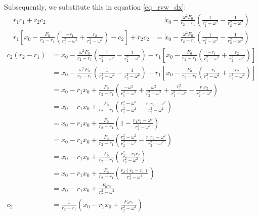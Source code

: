 Subsequently, we substitute this in equation \ref{eq_rvw_dx}:
\begin{align*}
	r_1 c_1 + r_2 c_2  &= \dot{x}_0 - \frac{\omega^2 F_0 }{r_2 - r_1} \left( \frac{1}{r_1^2 - \omega^2}  -  \frac{1}{r_2^2 - \omega^2} \right) \\
	r_1 \left[  x_0 - \frac{F_0}{r_2 - r_1} \left(  \frac{-r_1}{r_1^2 - \omega^2} +  \frac{r_2}{r_2^2 - \omega^2}   \right) - c_2  \right] + r_2 c_2 &= \dot{x}_0 - \frac{\omega^2 F_0 }{r_2 - r_1} \left( \frac{1}{r_1^2 - \omega^2}  -  \frac{1}{r_2^2 - \omega^2} \right) 
\end{align*}
\begin{align*}
	c_2 (r_2 - r_1) & = \dot{x}_0 - \frac{\omega^2 F_0 }{r_2 - r_1} \left( \frac{1}{r_1^2 - \omega^2}  -  \frac{1}{r_2^2 - \omega^2} \right) - r_1 \left[  x_0 -  \frac{F_0}{r_2 - r_1} \left(  \frac{-r_1}{r_1^2 - \omega^2} +  \frac{r_2}{r_2^2 - \omega^2}  \right) \right] \\
	&= \dot{x}_0 - \frac{\omega^2 F_0 }{r_2 - r_1} \left( \frac{1}{r_1^2 - \omega^2}  -  \frac{1}{r_2^2 - \omega^2} \right) - r_1 \left[  x_0 - \frac{F_0}{r_2 - r_1} \left(  \frac{-r_1}{r_1^2 - \omega^2} +  \frac{r_2}{r_2^2 - \omega^2}  \right) \right] \\
	&= \dot{x}_0 - r_1 x_0 +  \frac{F_0}{r_2 - r_1} \left( \frac{ - \omega^2}{r_1^2 - \omega^2}  +  \frac{\omega^2}{r_2^2 - \omega^2} + \frac{r_1^2}{r_1^2 - \omega^2} -  \frac{r_1 r_2}{r_2^2 - \omega^2}   \right) \\
	&= \dot{x}_0 - r_1 x_0 +  \frac{F_0}{r_2 - r_1} \left( \frac{r_1^2 - \omega^2}{r_1^2 - \omega^2}  -  \frac{r_1 r_2 - \omega^2}{r_2^2 - \omega^2} \right)\\
	&= \dot{x}_0 - r_1 x_0 +  \frac{F_0}{r_2 - r_1} \left( 1  -  \frac{r_1 r_2 - \omega^2}{r_2^2 - \omega^2} \right) \\
	&= \dot{x}_0 - r_1 x_0 +  \frac{F_0}{r_2 - r_1} \left( \frac{r_2^2 - \omega^2}{r_2^2 - \omega^2}  -  \frac{r_1 r_2 - \omega^2}{r_2^2 - \omega^2}  \right)\\
	&= \dot{x}_0 - r_1 x_0 +  \frac{F_0}{r_2 - r_1} \left( \frac{r_2^2 - r_1 r_2}{r_2^2 - \omega^2}  \right)\\
	&= \dot{x}_0 - r_1 x_0 +  \frac{F_0}{r_2 - r_1} \left( \frac{r_2(r_2 - r_1)}{r_2^2 - \omega^2}  \right)\\
	&= \dot{x}_0 - r_1 x_0 +  \frac{F_0 r_2}{r_2^2 - \omega^2} \\
c_2 &= \frac{1}{r_2 - r_1} \left( \dot{x}_0 - r_1 x_0 +  \frac{F_0 r_2}{r_2^2 - \omega^2} \right)
\end{align*}

